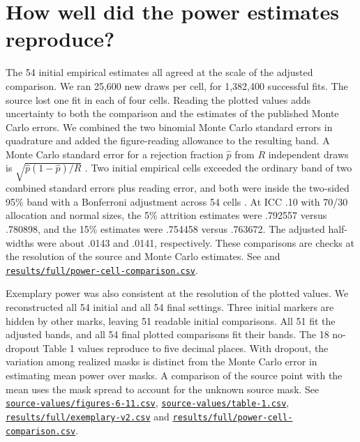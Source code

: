 \section{How well did the power estimates reproduce?}\label{sec:grid}
The 54 initial empirical estimates all agreed at the scale of the adjusted comparison. We ran 25,600 new draws per cell, for 1,382,400 successful fits. The source lost one fit in each of four cells. Reading the plotted values adds uncertainty to both the comparison and the estimates of the published Monte Carlo errors. We combined the two binomial Monte Carlo standard errors in quadrature and added the figure-reading allowance to the resulting band. A Monte Carlo standard error for a rejection fraction \(\hat p\) from \(R\) independent draws is \(\sqrt{\hat p(1-\hat p)/R}\) \citep{morris2019}. Two initial empirical cells exceeded the ordinary band of two combined standard errors plus reading error, and both were inside the two-sided 95\% band with a Bonferroni adjustment across 54 cells \citep{dunn1961}. At ICC .10 with 70/30 allocation and normal sizes, the 5\% attrition estimates were .792557 versus .780898, and the 15\% estimates were .754458 versus .763672. The adjusted half-widths were about .0143 and .0141, respectively. These comparisons are checks at the resolution of the source and Monte Carlo estimates. See \citet[Figures 6--8]{kupzyk2011} and \href{https://github.com/alectionary/vibe-math/blob/master/formalization/kupzyk-power-assumptions/results/full/power-cell-comparison.csv}{\nolinkurl{results/full/power-cell-comparison.csv}}.

Exemplary power was also consistent at the resolution of the plotted values. We reconstructed all 54 initial and all 54 final settings. Three initial markers are hidden by other marks, leaving 51 readable initial comparisons. All 51 fit the adjusted bands, and all 54 final plotted comparisons fit their bands. The 18 no-dropout Table 1 values reproduce to five decimal places. With dropout, the variation among realized masks is distinct from the Monte Carlo error in estimating mean power over masks. A comparison of the source point with the mean uses the mask spread to account for the unknown source mask. See \href{https://github.com/alectionary/vibe-math/blob/master/formalization/kupzyk-power-assumptions/source-values/figures-6-11.csv}{\nolinkurl{source-values/figures-6-11.csv}}, \href{https://github.com/alectionary/vibe-math/blob/master/formalization/kupzyk-power-assumptions/source-values/table-1.csv}{\nolinkurl{source-values/table-1.csv}}, \href{https://github.com/alectionary/vibe-math/blob/master/formalization/kupzyk-power-assumptions/results/full/exemplary-v2.csv}{\nolinkurl{results/full/exemplary-v2.csv}} and \href{https://github.com/alectionary/vibe-math/blob/master/formalization/kupzyk-power-assumptions/results/full/power-cell-comparison.csv}{\nolinkurl{results/full/power-cell-comparison.csv}}.

